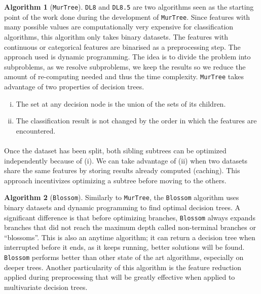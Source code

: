 \documentclass[12pt]{report}
\theoremstyle{definition}
\theoremstyle{definition}
\newtheorem*{algo}{Algorithm}
\theoremstyle{definition}
\begin{document}
\begin{algo}[\texttt{MurTree\cite{murtree}}]
    \texttt{DL8} and \texttt{DL8.5} are two algorithms seen as the starting point of the work done during the
    development of \texttt{MurTree}. Since features with many possible values are computationally very expensive
    for classification algorithms, this algorithm only takes binary datasets. The features with continuous or categorical
    features are binarised as a preprocessing step. The approach used is dynamic programming. The idea is to divide the
    problem into subproblems, as we resolve subproblems, we keep the results so we reduce the amount of re-computing
    needed and thus the time complexity. \texttt{MurTree} takes advantage of two properties of decision trees. 
    
    \begin{enumerate}[(i)]
        \item The set at any decision node is the union of the sets of its children.
        \item The classification result is not changed by the order in which the features are encountered.
    \end{enumerate}

    \paragraph{} Once the dataset has been split, both sibling subtrees can be optimized independently because of (i).
    We can take advantage of (ii) when two datasets share the same features by storing results already computed (caching).
    This approach incentivizes optimizing a subtree before moving to the others.
\end {algo}

\begin{algo}[\texttt{Blossom\cite{blossom}}]
    Similarly to \texttt{MurTree}, the \texttt{Blossom} algorithm uses binary datasets and dynamic programming to find
    optimal decision trees. A significant difference is that before optimizing branches, \texttt{Blossom} always expands
    branches that did not reach the maximum depth called non-terminal branches or ``blossoms''. This is also an anytime
    algorithm; it can return a decision tree when interrupted before it ends, as it keeps running, better solutions will
    be found. \texttt{Blossom} performs better than other state of the art algorithms, especially on deeper trees.
    Another particularity of this algorithm is the feature reduction applied during preprocessing that will be greatly
    effective when applied to multivariate decision trees.

\end {algo}
\end{document}
